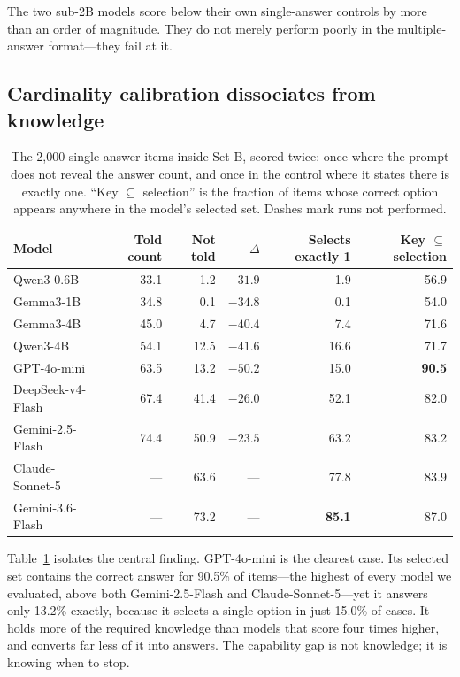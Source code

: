 \documentclass{article} %
\begin{document}
The two sub-2B models score below their own single-answer controls by more than an order of
magnitude. They do not merely perform poorly in the multiple-answer format---they fail at
it.

\subsection{Cardinality calibration dissociates from knowledge}
\label{sec:cardinality}

\begin{table}[t]
\caption{The 2,000 single-answer items inside Set B, scored twice: once where the prompt
does not reveal the answer count, and once in the control where it states there is exactly
one. ``Key $\subseteq$ selection'' is the fraction of items whose correct option appears
anywhere in the model's selected set. Dashes mark runs not performed.}
\label{tab:cardinality}
\begin{center}
\begin{small}
\begin{tabular}{lrrrrr}
\toprule
\textbf{Model} & \textbf{Told count} & \textbf{Not told} & \textbf{$\Delta$} &
\textbf{Selects exactly 1} & \textbf{Key $\subseteq$ selection} \\
\midrule
Qwen3-0.6B        & 33.1 &  1.2 & $-31.9$ &  1.9 & 56.9 \\
Gemma3-1B         & 34.8 &  0.1 & $-34.8$ &  0.1 & 54.0 \\
Gemma3-4B         & 45.0 &  4.7 & $-40.4$ &  7.4 & 71.6 \\
Qwen3-4B          & 54.1 & 12.5 & $-41.6$ & 16.6 & 71.7 \\
GPT-4o-mini       & 63.5 & 13.2 & $\mathbf{-50.2}$ & 15.0 & \textbf{90.5} \\
DeepSeek-v4-Flash & 67.4 & 41.4 & $-26.0$ & 52.1 & 82.0 \\
Gemini-2.5-Flash  & 74.4 & 50.9 & $-23.5$ & 63.2 & 83.2 \\
Claude-Sonnet-5   &  --- & 63.6 &  ---    & 77.8 & 83.9 \\
Gemini-3.6-Flash  &  --- & 73.2 &  ---    & \textbf{85.1} & 87.0 \\
\bottomrule
\end{tabular}
\end{small}
\end{center}
\end{table}

Table~\ref{tab:cardinality} isolates the central finding. GPT-4o-mini is the clearest case.
Its selected set contains the correct answer for 90.5\% of items---the highest of every
model we evaluated, above both Gemini-2.5-Flash and Claude-Sonnet-5---yet it answers only
13.2\% exactly, because it selects a single option in just 15.0\% of cases. It holds more
of the required knowledge than models that score four times higher, and converts far less
of it into answers. The capability gap is not knowledge; it is knowing when to stop.
\end{document}
